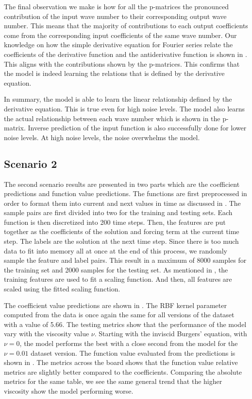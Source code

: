 The final observation we make is how for all the p-matrices the pronounced contribution of the input wave number to their corresponding output wave number. This means that the majority of contributions to each output coefficients come from the corresponding input coefficients of the same wave number. Our knowledge on how the simple derivative equation for Fourier series relate the coefficients of the derivative function and the antiderivative function is shown in . This aligns with the contributions shown by the p-matrices. This confirms that the model is indeed learning the relations that is defined by the derivative equation.

In summary, the model is able to learn the linear relationship defined by the derivative equation. This is true even for high noise levels. The model also learns the actual relationship between each wave number which is shown in the p-matrix. Inverse prediction of the input function is also successfully done for lower noise levels. At high noise levels, the noise overwhelms the model.

\subsection{Scenario 2}
\noindent The second scenario results are presented in two parts which are the coefficient predictions and function value predictions. The functions are first preprocessed in order to format them into current and next values in time as discussed in . The sample pairs are first divided into two for the training and testing sets. Each function is then discretized into 200 time steps. Then, the features are put together as the coefficients of the solution and forcing term at the current time step. The labels are the solution at the next time step. Since there is too much data to fit into memory all at once at the end of this process, we randomly sample the feature and label pairs. This result in a maximum of 8000 samples for the training set and 2000 samples for the testing set. As mentioned in , the training features are used to fit a scaling function. And then, all features are scaled using the fitted scaling function.

The coefficient value predictions are shown in . The RBF kernel parameter computed from the data is once again the same for all versions of the dataset with a value of 5.66. The testing metrics show that the performance of the model vary with the viscosity value \(\nu \). Starting with the inviscid Burgers' equation, with \(\nu=0\), the model performs the best with a close second from the model for the \(\nu = 0.01 \) dataset version. The function value evaluated from the predictions is shown in . The metrics across the board shows that the function value relative metrics are slightly better compared to the coefficients. Comparing the absolute metrics for the same table, we see the same general trend that the higher viscosity show the model performing worse.

